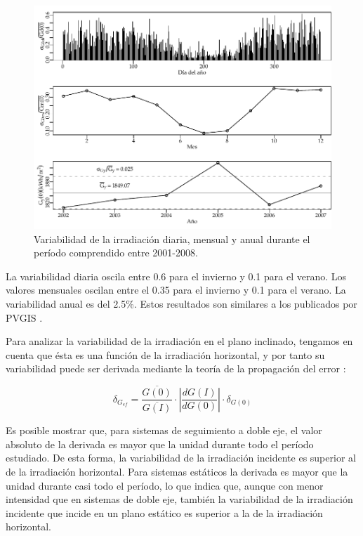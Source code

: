 %
\begin{figure}
\begin{centering}
\includegraphics[scale=0.75]{../figs/VariabilidadRadiacionDiario}
\end{centering}

\caption{\label{fig:VariabilityRadiation}Variabilidad de la irradiación diaria,
mensual y anual durante el período comprendido entre 2001-2008.}

\end{figure}


La variabilidad diaria oscila entre 0.6 para el invierno y 0.1 para
el verano. Los valores mensuales oscilan entre el 0.35 para el invierno
y 0.1 para el verano. La variabilidad anual es del 2.5\%. Estos resultados
son similares a los publicados por PVGIS \cite{Suri.Huld.ea2007}.

Para analizar la variabilidad de la irradiación en el plano inclinado,
tengamos en cuenta que ésta es una función de la irradiación horizontal,
y por tanto su variabilidad puede ser derivada mediante la teoría
de la propagación del error \cite{Navidi2008}:

\begin{equation}
\delta_{G_{ef}}=\frac{\overline{G(0)}}{\overline{G(I)}}\cdot\left|\frac{dG(I)}{dG(0)}\right|\cdot\delta_{G(0)}\end{equation}


Es posible mostrar \cite{Perpinan2009} que, para sistemas de seguimiento
a doble eje, el valor absoluto de la derivada es mayor que la unidad
durante todo el período estudiado. De esta forma, la variabilidad
de la irradiación incidente es superior al de la irradiación horizontal.
 Para sistemas estáticos la derivada es mayor que la unidad durante
casi todo el período, lo que indica que, aunque con menor intensidad
que en sistemas de doble eje, también la variabilidad de la irradiación
incidente que incide en un plano estático es superior a la de la irradiación
horizontal.

